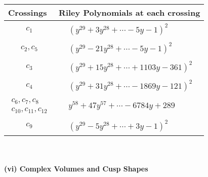 \documentclass[1p]{elsarticle_modified}
\theoremstyle{definition}
\begin{document}
\begin{tabular}{m{50pt}|m{274pt}}
Crossings & \hspace{64pt}Riley Polynomials at each crossing \\
\hline $$\begin{aligned}c_{1}\end{aligned}$$&$\begin{aligned}
&(y^{29}+3 y^{28}+\cdots-5 y-1)^{2}
\end{aligned}$\\
\hline $$\begin{aligned}c_{2},c_{5}\end{aligned}$$&$\begin{aligned}
&(y^{29}-21 y^{28}+\cdots-5 y-1)^{2}
\end{aligned}$\\
\hline $$\begin{aligned}c_{3}\end{aligned}$$&$\begin{aligned}
&(y^{29}+15 y^{28}+\cdots+1103 y-361)^{2}
\end{aligned}$\\
\hline $$\begin{aligned}c_{4}\end{aligned}$$&$\begin{aligned}
&(y^{29}+31 y^{28}+\cdots-1869 y-121)^{2}
\end{aligned}$\\
\hline $$\begin{aligned}c_{6},c_{7},c_{8}\\c_{10},c_{11},c_{12}\end{aligned}$$&$\begin{aligned}
&y^{58}+47 y^{57}+\cdots-6784 y+289
\end{aligned}$\\
\hline $$\begin{aligned}c_{9}\end{aligned}$$&$\begin{aligned}
&(y^{29}-5 y^{28}+\cdots+3 y-1)^{2}
\end{aligned}$\\
\hline
\end{tabular}\\~\\
\newpage\flushleft \textbf{(vi) Complex Volumes and Cusp Shapes}
\end{document}
